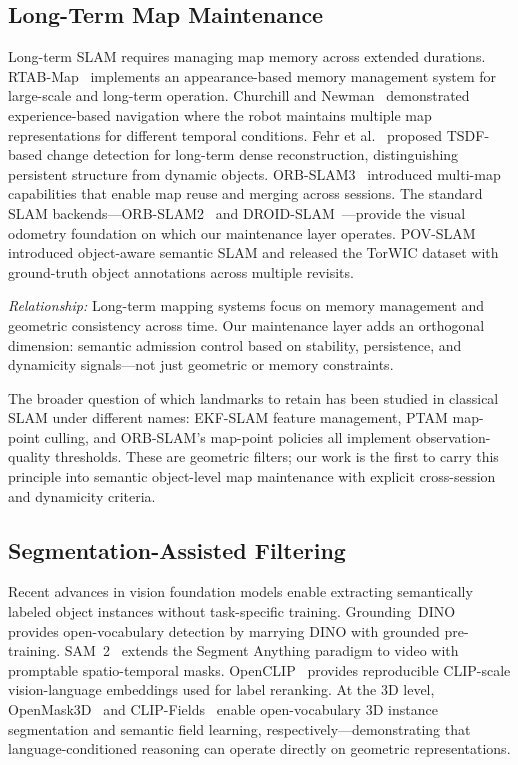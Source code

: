 \documentclass[journal]{IEEEtran}
\begin{document}
\subsection{Long-Term Map Maintenance}
\label{sec:related_longterm}

Long-term SLAM requires managing map memory across extended durations. RTAB-Map~\cite{labbe2019rtabmap} implements an appearance-based memory management system for large-scale and long-term operation. Churchill and Newman~\cite{churchill2012practice} demonstrated experience-based navigation where the robot maintains multiple map representations for different temporal conditions. Fehr et al.~\cite{fehr2016tsdf} proposed TSDF-based change detection for long-term dense reconstruction, distinguishing persistent structure from dynamic objects. ORB-SLAM3~\cite{campos2021orb3} introduced multi-map capabilities that enable map reuse and merging across sessions. The standard SLAM backends---ORB-SLAM2~\cite{murartal2015orb2} and DROID-SLAM~\cite{teed2021droidslam}---provide the visual odometry foundation on which our maintenance layer operates. POV-SLAM~\cite{barath2023povslam} introduced object-aware semantic SLAM and released the TorWIC dataset with ground-truth object annotations across multiple revisits.

\textit{Relationship:} Long-term mapping systems focus on memory management and geometric consistency across time. Our maintenance layer adds an orthogonal dimension: semantic admission control based on stability, persistence, and dynamicity signals---not just geometric or memory constraints.

The broader question of which landmarks to retain has been studied in classical SLAM under different names: EKF-SLAM feature management, PTAM map-point culling, and ORB-SLAM's map-point policies all implement observation-quality thresholds. These are geometric filters; our work is the first to carry this principle into semantic object-level map maintenance with explicit cross-session and dynamicity criteria.

\subsection{Segmentation-Assisted Filtering}
\label{sec:related_segmentation}

Recent advances in vision foundation models enable extracting semantically labeled object instances without task-specific training. Grounding~DINO~\cite{liu2024grounding} provides open-vocabulary detection by marrying DINO with grounded pre-training. SAM~2~\cite{ravi2024sam2} extends the Segment Anything paradigm to video with promptable spatio-temporal masks. OpenCLIP~\cite{cherti2023reproducible} provides reproducible CLIP-scale vision-language embeddings used for label reranking. At the 3D level, OpenMask3D~\cite{takmaz2023openmask3d} and CLIP-Fields~\cite{shafiullah2023clipfields} enable open-vocabulary 3D instance segmentation and semantic field learning, respectively---demonstrating that language-conditioned reasoning can operate directly on geometric representations.
\end{document}
